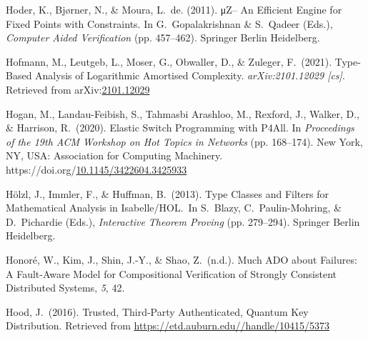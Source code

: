 \documentclass[12pt,twoside]{article}
\begin{document}
{\begin{thebibliography}{1079}
\mdbibitemlabel{}Hoder, K., Bjørner, N., \& Moura, L.~de. (2011). μZ– An Efficient Engine for Fixed Points with Constraints. In G.~Gopalakrishnan \& S.~Qadeer (Eds.), \emph{Computer Aided Verification} (pp. 457–462). Springer Berlin Heidelberg.%

\mdbibitemlabel{}Hofmann, M., Leutgeb, L., Moser, G., Obwaller, D., \& Zuleger, F.~(2021). Type-Based Analysis of Logarithmic Amortised Complexity. \emph{arXiv:2101.12029 {}[cs]}. Retrieved from arXiv:\href{http://arxiv.org/abs/2101.12029}{2101.12029}%

\mdbibitemlabel{}Hogan, M., Landau-Feibish, S., Tahmasbi Arashloo, M., Rexford, J., Walker, D., \& Harrison, R.~(2020). Elastic Switch Programming with P4All. In \emph{Proceedings of the 19th ACM Workshop on Hot Topics in Networks} (pp. 168–174). New York, NY, USA: Association for Computing Machinery. https://doi.org/\href{https://dx.doi.org/10.1145/3422604.3425933}{10.1145/3422604.3425933}%

\mdbibitemlabel{}Hölzl, J., Immler, F., \& Huffman, B.~(2013). Type Classes and Filters for Mathematical Analysis in Isabelle/HOL.~In S.~Blazy, C.~Paulin-Mohring, \& D.~Pichardie (Eds.), \emph{Interactive Theorem Proving} (pp. 279–294). Springer Berlin Heidelberg.%

\mdbibitemlabel{}Honoré, W., Kim, J., Shin, J.-Y., \& Shao, Z.~(n.d.). Much ADO about Failures: A Fault-Aware Model for Compositional Verification of Strongly Consistent Distributed Systems, \emph{5}, 42.%

\mdbibitemlabel{}Hood, J.~(2016). Trusted, Third-Party Authenticated, Quantum Key Distribution. Retrieved from \href{https://etd.auburn.edu//handle/10415/5373}{{\ttfamily https://\hspace{0pt}etd.\hspace{0pt}auburn.\hspace{0pt}edu//\hspace{0pt}handle/\hspace{0pt}10415/\hspace{0pt}5373}}%


\end{thebibliography}}
\end{document}

